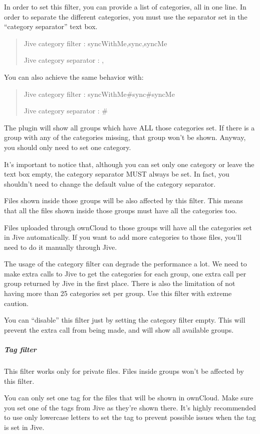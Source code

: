 \documentclass[letterpaper,10pt,english]{sphinxmanual}
\begin{document}
In order to set this filter, you can provide a list of categories, all in one line. In order to separate the
different categories, you must use the separator set in the “category separator” text box.
\begin{quote}

Jive category filter : syncWithMe,sync,syncMe

Jive category separator : ,
\end{quote}

You can also achieve the same behavior with:
\begin{quote}

Jive category filter : syncWithMe\#sync\#syncMe

Jive category separator : \#
\end{quote}

The plugin will show all groups which have ALL those categories set. If there is a group with any of the
categories missing, that group won't be shown. Anyway, you should only need to set one category.

It's important to notice that, although you can set only one category or leave the text box empty, the
category separator MUST always be set. In fact, you shouldn't need to change the default value of the category separator.

Files shown inside those groups will be also affected by this filter. This means that all the files
shown inside those groups must have all the categories too.

Files uploaded through ownCloud to those groups will have all the categories set in Jive automatically.
If you want to add more categories to those files, you'll need to do it manually through Jive.

The usage of the category filter can degrade the performance a lot.
We need to make extra calls to Jive to get the categories for each group, one extra call per group returned by Jive in the first place.
There is also the limitation of not having more than 25 categories set per group.
Use this filter with extreme caution.

You can “disable” this filter just by setting the category filter empty. This will prevent the extra call from
being made, and will show all available groups.


\subparagraph{Tag filter}
\label{enterprise_external_storage/jive_configuration:tag-filter}
This filter works only for private files. Files inside groups won't be affected by this filter.

You can only set one tag for the files that will be shown in ownCloud. Make sure you set one of the tags from Jive
as they're shown there. It's highly recommended to use only lowercase letters to set the tag to prevent possible
issues when the tag is set in Jive.
\end{document}
